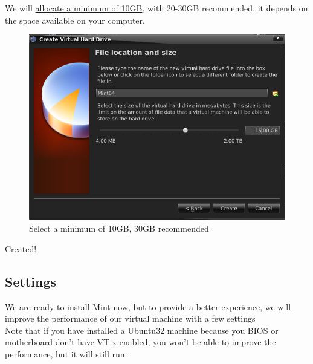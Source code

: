 \documentclass[a4paper]{article}
\begin{document}
We will \hyperref[fig:VB_createHDsize]{allocate a minimum of 10GB}, with 20-30GB recommended, it depends on the space available on your computer.\\
\begin{figure}[H]
    \centering
    \includegraphics[width=0.5\linewidth]{VB_createHDsize.png}
    \caption{Select a minimum of 10GB, 30GB recommended}
    \label{fig:VB_createHDsize}
\end{figure}

Created!
\subsection{Settings}
We are ready to install Mint now, but to provide a better experience, we will improve the performance of our virtual machine with a few settings\\
Note that if you have installed a Ubuntu32 machine because you BIOS or motherboard don't have VT-x enabled, you won't be able to improve the performance, but it will still run.\\
\end{document}
